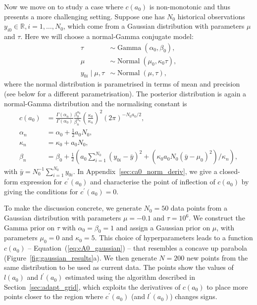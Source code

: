 \documentclass[a4paper, notitlepage, 11pt]{article}
\begin{document}
Now we move on to study a case where $c(a_0)$ is non-monotonic and thus presents a more challenging setting.
Suppose one has $N_0$ historical observations $y_{i0} \in \mathbb{R}, i = 1, \ldots, N_0$, which come from a Gaussian distribution with parameters $\mu$ and $\tau$.
Here we will choose a normal-Gamma conjugate model:
\begin{align*}
 \tau &\sim \operatorname{Gamma}(\alpha_0, \beta_0),\\
 \mu &\sim \operatorname{Normal}(\mu_0, \kappa_0\tau ),\\
 y_{0i} \mid \mu, \tau &\sim \operatorname{Normal}(\mu, \tau),
\end{align*}
where the normal distribution is parametrised in terms of mean and precision (see below for a different parametrisation).
The posterior distribution is again a normal-Gamma distribution and the normalising constant is
\begin{align}
 \label{eq:cA0_gaussian}
 c(a_0) &= \frac{\Gamma(\alpha_n)}{\Gamma(\alpha_0)}\frac{\beta_0^{\alpha_0}}{\beta_n^{\alpha_n}} \left(\frac{\kappa_0}{\kappa_n} \right)^2 (2\pi)^{-N_0 a_0/2},\\
 \nonumber
 \alpha_n &= \alpha_0 + \frac{1}{2}a_0N_0, \\
 \nonumber
 \kappa_n &= \kappa_0 + a_0N_0, \\
 \nonumber
 \beta_n  &= \beta_0 + \frac{1}{2}\left( a_0\sum_{i=1}^{N_0}(y_{0i}-\bar{y})^2 + \left(\kappa_0 a_0 N_0 (\bar{y}-\mu_0)^2\right)/\kappa_n \right),
\end{align}
with $\bar{y} = N_0^{-1}\sum_{i=1}^{N_0} y_{0i}$.
In Appendix~\ref{sec:ca0_norm_deriv}, we give a closed-form expression for $c^\prime(a_0)$ and characterise the point of inflection of $c(a_0)$ by giving the conditions for $c^\prime(a_0) = 0$.

To make the discussion concrete, we generate $N_0 = 50$ data points from a Gaussian distribution with parameters $\mu = -0.1$ and  $\tau = 10^{6}$.
We construct the Gamma prior on $\tau$ with $\alpha_0 = \beta_0 = 1$ and assign a Gaussian prior on $\mu$, with parameters $\mu_0 = 0$ and $\kappa_0 = 5$.
This
choice of hyperparameters leads to a function $c(a_0)$ -- Equation~(\ref{eq:cA0_gaussian}) -- that resembles a concave up parabola (Figure~\ref{fig:gaussian_results}a). 
We then generate $N = 200$ new points from the same distribution to be used as current data.
The points show the values of $l(a_0)$ and $l^\prime(a_0)$ estimated using the algorithm described in Section~\ref{sec:adapt_grid}, which exploits the derivatives of $c(a_0)$ to place more points closer to the region where $c^\prime(a_0)$ (and $l^\prime(a_0)$) changes signs.
\end{document}

